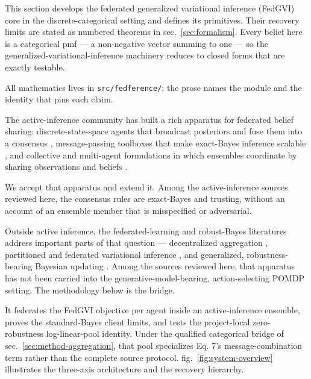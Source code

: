 \documentclass[
  english,
]{article}
\theoremstyle{plain}
\theoremstyle{definition}
\theoremstyle{remark}
\theoremstyle{definition}
\begin{document}
\protect{}\label{sec:methodology}{}

This section develops the federated generalized variational inference
(FedGVI) core in the discrete-categorical setting and defines its
primitives. Their recovery limits are stated as numbered theorems in
sec.~\ref{sec:formalism}. Every belief here is a categorical pmf --- a
non-negative vector summing to one --- so the
generalized-variational-inference machinery reduces to closed forms that
are exactly testable.

All mathematics lives in \texttt{src/fedference/}; the prose names the
module and the identity that pins each claim.

The active-inference community has built a rich apparatus for federated
belief sharing: discrete-state-space agents that broadcast posteriors
and fuse them into a consensus
\citep{dacosta2020active, friston2024federated}, message-passing
toolboxes that make exact-Bayes inference scalable
\citep{heins2022pymdp, bagaev2023rxinfer}, and collective and
multi-agent formulations in which ensembles coordinate by sharing
observations and beliefs
\citep{heins2023collective, albarracin2022epistemic, kaufmann2021collective}.

We accept that apparatus and extend it. Among the active-inference
sources reviewed here, the consensus rules are exact-Bayes and trusting,
without an account of an ensemble member that is misspecified or
adversarial.

Outside active inference, the federated-learning and robust-Bayes
literatures address important parts of that question --- decentralized
aggregation \citep{mcmahan2017communication}, partitioned and federated
variational inference \citep{ashman2022partitioned, bui2018partitioned},
and generalized, robustness-bearing Bayesian updating
\citep{bissiri2016general, knoblauch2022generalized, basu1998robust, zhang2018generalized}.
Among the sources reviewed here, that apparatus has not been carried
into the generative-model-bearing, action-selecting POMDP setting. The
methodology below is the bridge.

It federates the FedGVI objective \citep{mildner2025fedgvi} per agent
inside an active-inference ensemble, proves the standard-Bayes client
limits, and tests the project-local zero-robustness log-linear-pool
identity. Under the qualified categorical bridge of
sec.~\ref{sec:method-aggregation}, that pool specializes Eq. 7's
message-combination term rather than the complete source protocol.
fig.~\ref{fig:system-overview} illustrates the three-axis architecture
and the recovery hierarchy.
\end{document}
